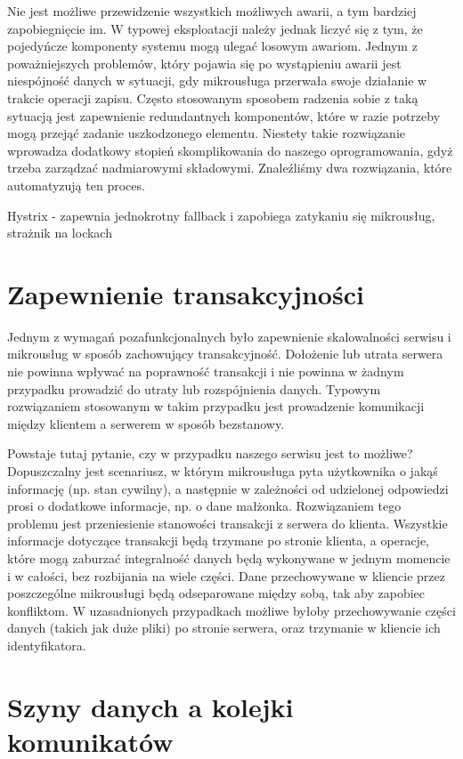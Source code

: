 \documentclass[licencjacka]{pracamgr}
\begin{document}
Nie jest możliwe przewidzenie wszystkich możliwych awarii, a tym bardziej zapobiegnięcie im. W typowej eksploatacji należy jednak liczyć się z tym, że pojedyńcze komponenty systemu mogą ulegać losowym awariom. Jednym z poważniejszych problemów, który pojawia się po wystąpieniu awarii jest niespójność danych w sytuacji, gdy mikrousługa przerwała swoje działanie w trakcie operacji zapisu. Często stosowanym sposobem radzenia sobie z taką sytuacją jest zapewnienie redundantnych komponentów, które w razie potrzeby mogą przejąć zadanie uszkodzonego elementu. Niestety takie rozwiązanie wprowadza dodatkowy stopień skomplikowania do naszego oprogramowania, gdyż trzeba zarządzać nadmiarowymi składowymi. Znaleźliśmy dwa rozwiązania, które automatyzują ten proces.

Hystrix - zapewnia jednokrotny fallback i zapobiega zatykaniu się mikrousług, strażnik na lockach %

\section{Zapewnienie transakcyjności}

Jednym z wymagań pozafunkcjonalnych było zapewnienie skalowalności serwisu i mikrousług w sposób zachowujący transakcyjność.
Dołożenie lub utrata serwera nie powinna wpływać na poprawność transakcji i nie powinna w żadnym przypadku
prowadzić do utraty lub rozspójnienia danych. Typowym rozwiązaniem stosowanym w takim przypadku jest prowadzenie
komunikacji między klientem a serwerem w sposób bezstanowy.

Powstaje tutaj pytanie, czy w przypadku naszego serwisu jest to możliwe? Dopuszczalny jest scenariusz, w którym
mikrousługa pyta użytkownika o jakąś informację (np. stan cywilny), a następnie w zależności od udzielonej odpowiedzi
prosi o dodatkowe informacje, np. o dane małżonka. Rozwiązaniem tego problemu jest przeniesienie stanowości
transakcji z serwera do klienta. Wszystkie informacje dotyczące transakcji będą trzymane po stronie klienta, a
operacje, które mogą zaburzać integralność danych będą wykonywane w jednym momencie i w całości, bez rozbijania
na wiele części. Dane przechowywane w kliencie przez poszczególne mikrousługi będą odseparowane między sobą, tak aby
zapobiec konfliktom. W uzasadnionych przypadkach możliwe byłoby przechowywanie części danych (takich jak duże pliki)
po stronie serwera, oraz trzymanie w kliencie ich identyfikatora.

\section{Szyny danych a kolejki komunikatów}
\end{document}
